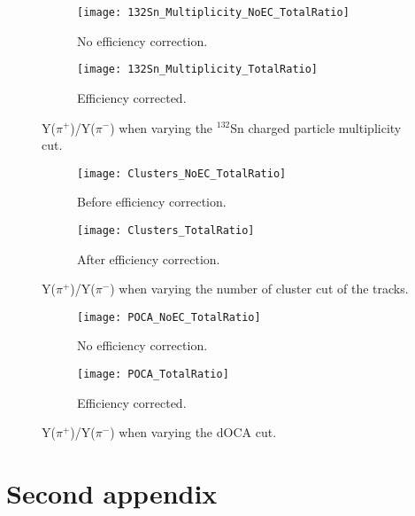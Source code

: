 \begin{figure}[!htb]
     \centering
     \begin{subfigure}[b]{\textwidth}
         \centering
         \texttt{[image: 132Sn\_Multiplicity\_NoEC\_TotalRatio]}
         \caption{No efficiency correction.}
         \label{fig:ratio_multCutVar}
     \end{subfigure}
     \hfill
    \begin{subfigure}[b]{\textwidth}
         \centering
         \texttt{[image: 132Sn\_Multiplicity\_TotalRatio]}
         \caption{Efficiency corrected.}
         \label{fig:ratio_multCutVar}
     \end{subfigure}
     \hfill
\caption{Y($\pi^+$)/Y($\pi^-$) when varying the ${}^{132}$Sn charged particle multiplicity cut. }
\label{fig:cutVar}
\end{figure}



\begin{figure}[!htb]
     \centering
     \begin{subfigure}[b]{\textwidth}
         \centering
         \texttt{[image: Clusters\_NoEC\_TotalRatio]}
         \caption{Before efficiency correction.}
         \label{fig:ratio_clustVar_NoEC}
     \end{subfigure}
     \hfill
    \begin{subfigure}[b]{\textwidth}
         \centering
         \texttt{[image: Clusters\_TotalRatio]}
         \caption{After efficiency correction.}
         \label{fig:ratio_clustVar_EC}
     \end{subfigure}
     \hfill
\caption{Y($\pi^+$)/Y($\pi^-$) when varying the number of cluster cut of the tracks.}
\label{fig:pim_clustVar}
\end{figure}




\begin{figure}[!htb]
     \centering
     \begin{subfigure}[b]{\textwidth}
         \centering
         \texttt{[image: POCA\_NoEC\_TotalRatio]}
         \caption{No efficiency correction.}
         \label{fig:ratio_cutVarPOCA_NoEC}
     \end{subfigure}
     \hfill
    \begin{subfigure}[b]{\textwidth}
         \centering
         \texttt{[image: POCA\_TotalRatio]}
         \caption{Efficiency corrected.}
         \label{fig:ratio_cutVarPOCA_EC}
     \end{subfigure}
     \hfill
\caption{Y($\pi^+$)/Y($\pi^-$) when varying the dOCA cut.}
\label{fig:pip_cutVarPOCA}
\end{figure}


\chapter{Second appendix}


